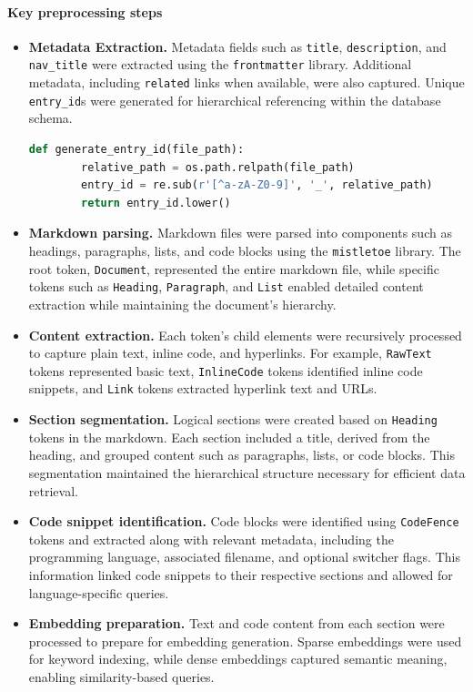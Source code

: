 \paragraph*{Key preprocessing steps}

\begin{itemize}
	\item \textbf{Metadata Extraction.}
	Metadata fields such as \texttt{title}, \texttt{description}, and \texttt{nav\_title} were extracted using the \texttt{frontmatter} library. Additional metadata, including \texttt{related} links when available, were also captured. Unique \texttt{entry\_id}s were generated for hierarchical referencing within the database schema.
	
	\begin{lstlisting}[language=Python, caption=Generating unique entry IDs]
		def generate_entry_id(file_path):
		relative_path = os.path.relpath(file_path)
		entry_id = re.sub(r'[^a-zA-Z0-9]', '_', relative_path)
		return entry_id.lower()
	\end{lstlisting}
	
	\item \textbf{Markdown parsing.} 
	Markdown files were parsed into components such as headings, paragraphs, lists, and code blocks using the \texttt{mistletoe} library. The root token, \texttt{Document}, represented the entire markdown file, while specific tokens such as \texttt{Heading}, \texttt{Paragraph}, and \texttt{List} enabled detailed content extraction while maintaining the document's hierarchy.
	
	\item \textbf{Content extraction.} 
	Each token's child elements were recursively processed to capture plain text, inline code, and hyperlinks. For example, \texttt{RawText} tokens represented basic text, \texttt{InlineCode} tokens identified inline code snippets, and \texttt{Link} tokens extracted hyperlink text and URLs.
	
	\item \textbf{Section segmentation.} 
	Logical sections were created based on \texttt{Heading} tokens in the markdown. Each section included a title, derived from the heading, and grouped content such as paragraphs, lists, or code blocks. This segmentation maintained the hierarchical structure necessary for efficient data retrieval.
	
	\item \textbf{Code snippet identification.} 
	Code blocks were identified using \texttt{CodeFence} tokens and extracted along with relevant metadata, including the programming language, associated filename, and optional switcher flags. This information linked code snippets to their respective sections and allowed for language-specific queries.
	
	\item \textbf{Embedding preparation.} 
	Text and code content from each section were processed to prepare for embedding generation. Sparse embeddings were used for keyword indexing, while dense embeddings captured semantic meaning, enabling similarity-based queries.
\end{itemize}

